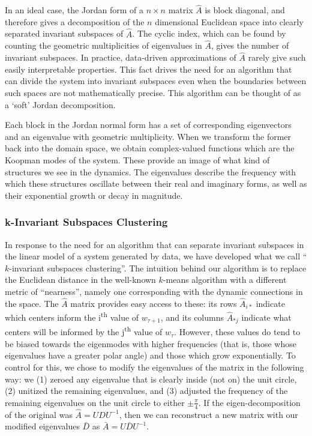 \documentclass[letterpaper,12pt,peerreviewca,draftcls]{IEEEtran}
\newcommand{\weight}{w}
\newcommand{\dualop}{A}
\newcommand{\dualopApprox}{\widehat{\dualop}}
\newcommand{\tindex}{\tau}
\begin{document}
In an ideal case, the Jordan form of a $n\times n$ matrix $\dualopApprox$ is block diagonal, and therefore gives a decomposition of the $n$ dimensional Euclidean space into clearly separated invariant subspaces of $\dualopApprox$. The cyclic index, which can be found by counting the geometric multiplicities of eigenvalues in $\dualopApprox$, gives the number of invariant subspaces. In practice, data-driven approximations of $\dualopApprox$ rarely give such easily interpretable properties. This fact drives the need for an algorithm that can divide the system into invariant subspaces even when the boundaries between such spaces are not mathematically precise. This algorithm can be thought of as a `soft' Jordan decomposition.

Each block in the Jordan normal form has a set of corresponding eigenvectors and an eigenvalue with geometric multiplicity. When we transform the former back into the domain space, we obtain complex-valued functions which are the Koopman modes of the system. These provide an image of what kind of structures we see in the dynamics. The eigenvalues describe the frequency with which these structures oscillate between their real and imaginary forms, as well as their exponential growth or decay in magnitude. %


\subsubsection{k-Invariant Subspaces Clustering}
In response to the need for an algorithm that can separate invariant subspaces in the linear model of a system generated by data, we have developed what we call ``$k$-invariant subspaces clustering''. The intuition behind our algorithm is to replace the Euclidean distance in the well-known $k$-means algorithm with a different metric of ``nearness'', namely one corresponding with the dynamic connections in the space. The $\dualopApprox$ matrix provides easy access to these: its rows $\dualopApprox_{i\ast}$ indicate which centers inform the i\textsuperscript{th} value of $\weight_{\tindex+1}$, and its columns $\dualopApprox_{\ast j}$ indicate what centers will be informed by the j\textsuperscript{th} value of $\weight_{\tindex}$. However, these values do tend to be biased towards the eigenmodes with higher frequencies (that is, those whose eigenvalues have a greater polar angle) and those which grow exponentially. To  control for this, we chose to modify the eigenvalues of the matrix in the following way: we (1) zeroed any eigenvalue that is clearly inside (not on) the unit circle, (2) unitized the remaining eigenvalues, and (3) adjusted the frequency of the remaining eigenvalues on the unit circle to either $\pm \frac{\pi}{4}$. If the eigen-decomposition of the original was $\dualopApprox = UDU^{-1}$, then we can reconstruct a new matrix with our modified eigenvalues $\bar D$ as $\bar A = U\bar D U^{-1}$.
\end{document}

